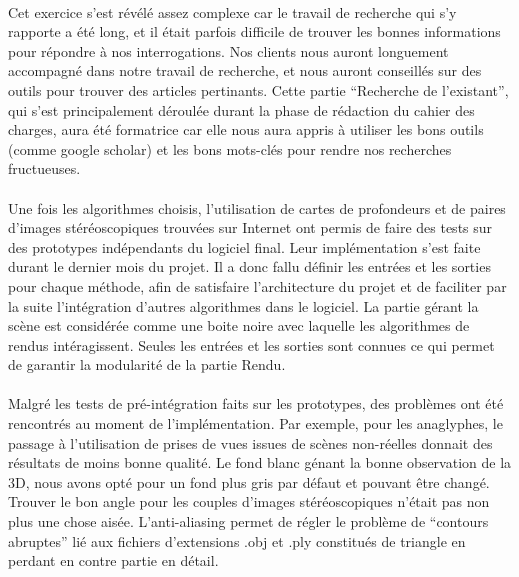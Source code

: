 \paragraph{}
Cet exercice s'est révélé assez complexe car le travail de recherche qui s'y rapporte a été long, et il était parfois difficile de trouver les bonnes informations pour répondre à nos interrogations. Nos clients nous auront longuement accompagné dans notre travail de recherche, et nous auront conseillés sur des outils pour trouver des articles pertinants. Cette partie ``Recherche de l'existant'', qui s'est principalement déroulée durant la phase de rédaction du cahier des charges, aura été formatrice car elle nous aura appris à utiliser les bons outils (comme google scholar\footnotemark) et les bons mots-clés pour rendre nos recherches fructueuses.
\paragraph{}
Une fois les algorithmes choisis, l'utilisation de cartes de profondeurs et de paires d'images stéréoscopiques trouvées sur Internet ont permis de faire des tests sur des prototypes indépendants du logiciel final. Leur implémentation s'est faite durant le dernier mois du projet. Il a donc fallu définir les entrées et les sorties pour chaque méthode, afin de satisfaire l'architecture du projet et de faciliter par la suite l'intégration d'autres algorithmes dans le logiciel.
La partie gérant la scène est considérée comme une boite noire avec laquelle les algorithmes de rendus intéragissent. Seules les entrées et les sorties sont connues ce qui permet de garantir la modularité de la partie Rendu. 

\paragraph{}
Malgré les tests de pré-intégration faits sur les prototypes, des problèmes ont été rencontrés au moment de l'implémentation. Par exemple, pour les anaglyphes, le passage à l'utilisation de prises de vues issues de scènes non-réelles donnait des résultats de moins bonne qualité. Le fond blanc génant la bonne observation de la 3D, nous avons opté pour un fond plus gris par défaut et pouvant être changé. Trouver le bon angle pour les couples d'images stéréoscopiques n'était pas non plus une chose aisée. L'anti-aliasing permet de régler le problème de ``contours abruptes'' lié aux fichiers d'extensions .obj et .ply constitués de triangle en perdant en contre partie en détail.

